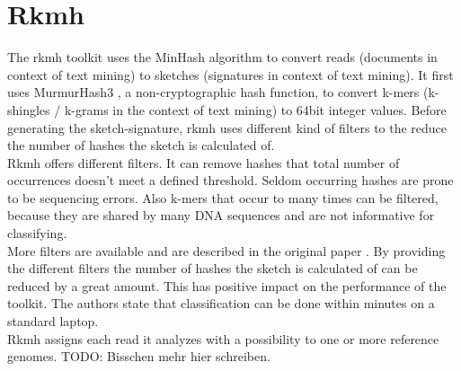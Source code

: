 \newpage

\section{Rkmh}

The rkmh toolkit uses the MinHash algorithm to convert reads (documents in context of text mining) to sketches (signatures in context of text mining). It first uses MurmurHash3 \cite{murmurHash}, a non-cryptographic hash function, to convert k-mers (k-shingles / k-grams in the context of text mining) to 64bit integer values. Before generating the sketch-signature, rkmh uses different kind of filters to the reduce the number of hashes the sketch is calculated of.\\

Rkmh offers different filters. It can remove hashes that total number of occurrences doesn't meet a defined threshold. Seldom occurring hashes are prone to be sequencing errors. Also k-mers that occur to many times can be filtered, because they are shared by many DNA sequences and are not informative for classifying.\\

More filters are available and are described in the original paper \cite{rkmh}. By providing the different filters the number of hashes the sketch is calculated of can be reduced by a great amount. This has positive impact on the performance of the toolkit. The authors state that classification can be done within minutes on a standard laptop.\\

Rkmh assigns each read it analyzes with a possibility to one or more reference genomes. TODO: Bisschen mehr hier schreiben.